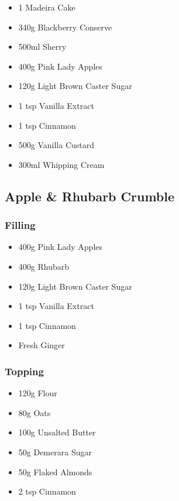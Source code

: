 \documentclass[11pt, english]{article}
\begin{document}
	\begin{itemize}
        \setlength\itemsep{0cm}
                \item 1 Madeira Cake
		\item 340g Blackberry Conserve 
		\item 500ml Sherry
		\item 400g Pink Lady Apples
		\item 120g Light Brown Caster Sugar
		\item 1 tsp Vanilla Extract
		\item 1 tsp Cinnamon
		\item 500g Vanilla Custard
		\item 300ml Whipping Cream
        \end{itemize}

\newpage

	\subsection{Apple \& Rhubarb Crumble}

		\subsubsection*{Filling}

	\begin{itemize}
        \setlength\itemsep{0cm}
                \item 400g Pink Lady Apples
		\item 400g Rhubarb
		\item 120g Light Brown Caster Sugar
		\item 1 tsp Vanilla Extract
		\item 1 tsp Cinnamon
		\item Fresh Ginger
        \end{itemize}

		\subsubsection*{Topping}

	\begin{itemize}
        \setlength\itemsep{0cm}
                \item 120g Flour
		\item 80g Oats
		\item 100g Unsalted Butter
		\item 50g Demerara Sugar
		\item 50g Flaked Almonds
		\item 2 tsp Cinnamon
        \end{itemize}
\end{document}
